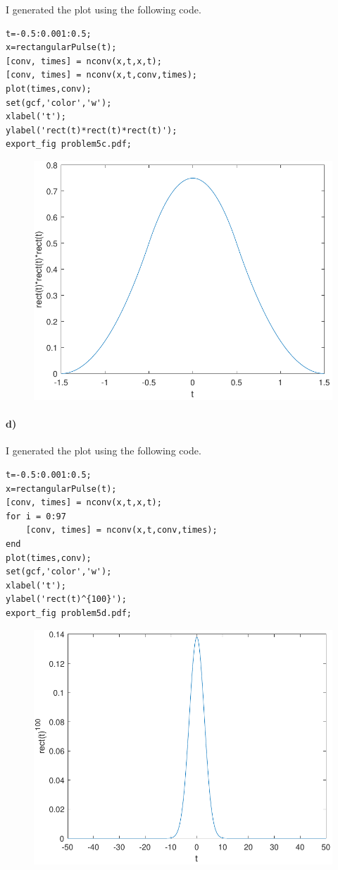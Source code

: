 \documentclass[12pt]{article}
\begin{document}
I generated the plot using the following code.
\begin{verbatim}
t=-0.5:0.001:0.5;
x=rectangularPulse(t);
[conv, times] = nconv(x,t,x,t);
[conv, times] = nconv(x,t,conv,times);
plot(times,conv);
set(gcf,'color','w');
xlabel('t');
ylabel('rect(t)*rect(t)*rect(t)');
export_fig problem5c.pdf;
\end{verbatim}
\begin{figure}[H]
    \begin{center}
        \includegraphics[width=4.5in]{problem5c.pdf}
    \end{center}
\end{figure}

\pagebreak

\paragraph{d)}

I generated the plot using the following code.
\begin{verbatim}
t=-0.5:0.001:0.5;
x=rectangularPulse(t);
[conv, times] = nconv(x,t,x,t);
for i = 0:97
    [conv, times] = nconv(x,t,conv,times);
end
plot(times,conv);
set(gcf,'color','w');
xlabel('t');
ylabel('rect(t)^{100}');
export_fig problem5d.pdf;
\end{verbatim}
\begin{figure}[H]
    \begin{center}
        \includegraphics[width=4.5in]{problem5d.pdf}
    \end{center}
\end{figure}
\end{document}
